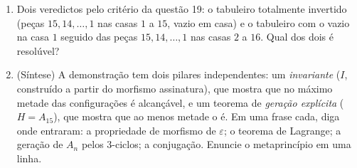 \begin{problem}
\begin{enumerate}[resume]
        tem exatamente $n(n - 1)$ configurações \emph{(as
        classes são as órbitas de um  de ordem
        $\operatorname{lcm}(n, n-1) = n(n-1)$)}, e que há
        $(n - 2)!$ classes --- para $n \geq 5$ muito mais do que
        $2$: num tabuleiro estreito o invariante de paridade quase nada
        captura, e é a geometria que manda.
  \item Dois veredictos pelo critério da questão 19: o tabuleiro totalmente
        invertido (peças $15, 14, \dots, 1$ nas casas $1$
        a $15$, vazio em casa) e o tabuleiro com o vazio na casa
        $1$ seguido das peças $15, 14, \dots, 1$ nas casas $2$
        a $16$. Qual dos dois é resolúvel?
  \item (Síntese) A demonstração tem dois pilares independentes: um
        \emph{invariante} ($I$, construído a partir do morfismo assinatura),
        que mostra que no máximo metade das configurações é alcançável, e
        um teorema de \emph{geração explícita} ($H = A_{15}$),
        que mostra que ao menos metade o é. Em uma frase cada, diga onde
        entraram: a propriedade de morfismo de
        $\varepsilon$; o teorema de Lagrange; a geração de $A_n$
        pelos $3$-ciclos; a conjugação. Enuncie o metaprincípio em
        uma linha.
\end{enumerate}
\end{problem}

